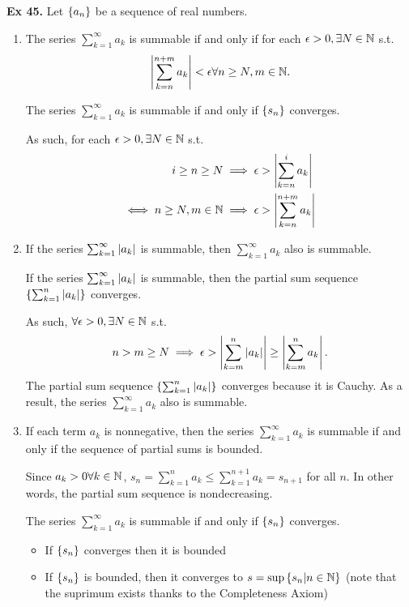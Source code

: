 \noindent \textbf{Ex 45.} \label{ex:45}
Let $\left\{a_n\right\}$ be a sequence of real numbers.
\begin{enumerate}[label=(\roman*)]
    \item The series $\sum_{k=1}^\infty a_k$ is summable if and only if for each $\epsilon > 0, \exists N\in\mathbb{N}$ s.t.
    \[ \left|\sum_{k=n}^{n+m} a_k\right| < \epsilon \forall n \geq N, m \in \mathbb{N}.\]
    
    The series $\sum_{k=1}^{\infty} a_k$ is summable if and only if $\left\{s_n\right\}$ converges.

    As such, for each $\epsilon > 0, \exists N \in \mathbb{N}$ s.t.
    \begin{align*}
        i \geq n \geq N &\implies \epsilon > \left|\sum_{k=n}^{i} a_k\right| \\
        \iff n \geq N, m \in \mathbb{N} &\implies \epsilon > \left|\sum_{k=n}^{n+m} a_k\right|
    \end{align*}
    
    \item If the series $\sum_{k=1}^\infty \left|a_k\right|$ is summable, then $\sum_{k=1}^\infty a_k$ also is summable.

    If the series $\sum_{k=1}^\infty \left|a_k\right|$ is summable, then the partial sum sequence $\left\{\sum_{k=1}^{n} \left|a_k\right|\right\}$ converges.
    
    As such, $\forall \epsilon > 0, \exists N \in\mathbb{N}$ s.t.
    \[ n > m \geq N \implies \epsilon > \left|\sum_{k=m}^{n} \left|a_k\right|\right| \geq \left|\sum_{k=m}^{n} a_k\right|. \]
    The partial sum sequence $\left\{\sum_{k=1}^{n} \left|a_k\right|\right\}$ converges because it is Cauchy. As a result, the series $\sum_{k=1}^\infty a_k$ also is summable.

    \item If each term $a_k$ is nonnegative, then the series $\sum_{k=1}^\infty a_k$ is summable if and only if the sequence of partial sums is bounded.
    
    Since $a_k > 0 \forall k\in\mathbb{N}$, $s_n = \sum_{k=1}^{n} a_k \leq \sum_{k=1}^{n+1} a_k = s_{n+1}$ for all $n$. In other words, the partial sum sequence is nondecreasing.

    The series $\sum_{k=1}^{\infty} a_k$ is summable if and only if $\left\{s_n\right\}$ converges.
    \begin{itemize}
        \item If $\left\{s_n\right\}$ converges then it is bounded
        \item If $\left\{s_n\right\}$ is bounded, then it converges to $s = \sup\left\{s_n | n \in \mathbb{N}\right\}$ (note that the suprimum exists thanks to the Completeness Axiom)
        

\end{itemize}
\end{enumerate}

